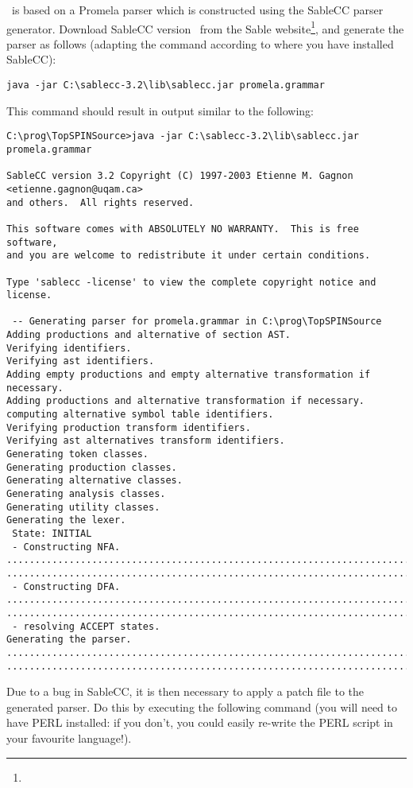 \topspin\ is based on a Promela parser which is constructed using
the SableCC parser generator.  Download SableCC version
\sableccversion\ from the Sable
website\footnote{\texttt{\sableccwebsite}}, and generate the parser
as follows (adapting the command according to where you have
installed SableCC):
%
\begin{lstlisting}
java -jar C:\sablecc-3.2\lib\sablecc.jar promela.grammar
\end{lstlisting}
%
This command should result in output similar to the following:
%
\begin{lstlisting}
C:\prog\TopSPINSource>java -jar C:\sablecc-3.2\lib\sablecc.jar
promela.grammar

SableCC version 3.2 Copyright (C) 1997-2003 Etienne M. Gagnon <etienne.gagnon@uqam.ca>
and others.  All rights reserved.

This software comes with ABSOLUTELY NO WARRANTY.  This is free software,
and you are welcome to redistribute it under certain conditions.

Type 'sablecc -license' to view the complete copyright notice and license.

 -- Generating parser for promela.grammar in C:\prog\TopSPINSource
Adding productions and alternative of section AST.
Verifying identifiers.
Verifying ast identifiers.
Adding empty productions and empty alternative transformation if necessary.
Adding productions and alternative transformation if necessary.
computing alternative symbol table identifiers.
Verifying production transform identifiers.
Verifying ast alternatives transform identifiers.
Generating token classes.
Generating production classes.
Generating alternative classes.
Generating analysis classes.
Generating utility classes.
Generating the lexer.
 State: INITIAL
 - Constructing NFA.
..............................................................................
..............................................................................
 - Constructing DFA.
..............................................................................
..............................................................................
 - resolving ACCEPT states.
Generating the parser.
..............................................................................
..............................................................................
\end{lstlisting}

Due to a bug in SableCC, it is then necessary to apply a patch file to the generated parser.  Do this by executing
the following command (you will need to have PERL installed: if you don't, you could easily re-write the
PERL script in your favourite language!).

